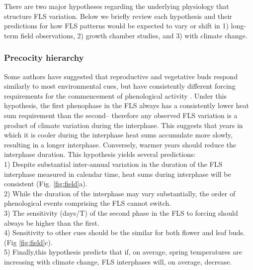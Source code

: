 \documentclass[11pt]{article}
\begin{document}
\noindent There are two major hypotheses regarding the underlying physiology that structure FLS variation. Below we briefly review each hypothesis and their predictions for how FLS patterns would be expected to vary or shift in 1) long-term field observations, 2) growth chamber studies, and 3) with climate change.

\subsubsection*{Precocity hierarchy}%
\noindent Some authors have suggested that reproductive and vegetative buds respond similarly to most environmental cues, but have consistently different forcing requirements for the commencement of phenological activity \citep{Guo_2014}. Under this hypothesis, the first phenophase in the FLS always has a consistently lower heat sum requirement than the second-- therefore any observed FLS variation is a product of climate variation during the interphase. This suggests that years in which it is cooler during the interphase heat sums accumulate more slowly, resulting in a longer interphase. Conversely, warmer years should reduce the interphase duration. This hypothesis yields several predictions:\\

1) Despite substantial inter-annual variation in the duration of the FLS interphase measured in calendar time, heat sums during interphase will be consistent (Fig. \ref{fig:field}a).\\ 2) While the duration of the interphase may vary substantially, the order of phenological events comprising the FLS cannot switch.\\ 3) The sensitivity (\delta days/\delta T) of the second phase in the FLS to forcing should always be higher than the first.\\ 4) Sensitivity to other cues should be the similar for both flower and leaf buds. (Fig \ref{fig:field}c).\\ 5) Finally,this hypothesis predicts that if, on average, spring temperatures are increasing with climate change, FLS interphases will, on average, decrease.\\
\end{document}
